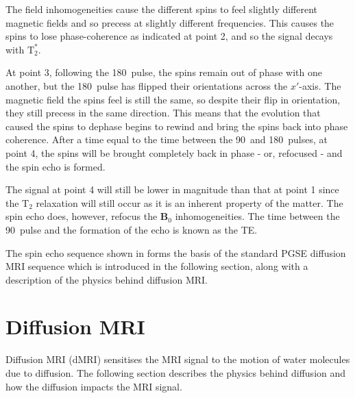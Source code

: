 The field inhomogeneities cause the different spins to feel slightly different magnetic fields and so precess at slightly different frequencies. 
This causes the spins to lose phase-coherence as indicated at point 2, and so the signal decays with $\mathrm{T}_2^*$.  

At point 3, following the 180\degree\ pulse, the spins remain out of phase with one another, but the 180\degree\ pulse has flipped their orientations across the $x'$-axis. 
The magnetic field the spins feel is still the same, so despite their flip in orientation, they still precess in the same direction. 
This means that the evolution that caused the spins to dephase begins to rewind and bring the spins back into phase coherence. 
After a time equal to the time between the 90\degree\ and 180\degree\ pulses, at point 4, the spins will be brought completely back in phase - or, refocused - and the spin echo is formed. 

The signal at point 4 will still be lower in magnitude than that at point 1 since the $\mathrm{T}_2$ relaxation will still occur as it is an inherent property of the matter. 
The spin echo does, however, refocus the $\mathbf{B}_0$ inhomogeneities. 
The time between the 90\degree\ pulse and the formation of the echo is known as the \ac{TE}. 

The spin echo sequence shown in  forms the basis of the standard \ac{PGSE} diffusion MRI sequence which is introduced in the following section, along with a description of the physics behind diffusion MRI. 

\section{Diffusion MRI}
\label{sec:diffusion_physics}
Diffusion MRI (dMRI) sensitises the \ac{MRI} signal to the motion of water molecules due to diffusion. The following section describes the physics behind diffusion and how the diffusion impacts the \ac{MRI} signal.



